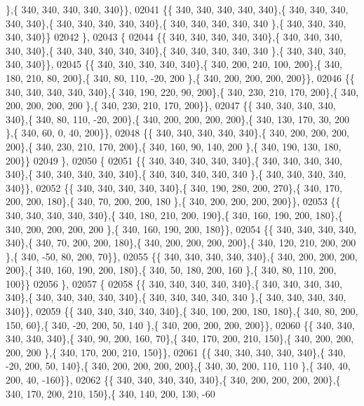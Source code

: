 \begin{DoxyCode}
      \},\{ 340, 340, 340, 340, 340\}\},
02041 \{\{ 340, 340, 340, 340, 340\},\{ 340, 340, 340, 340, 340\},\{ 340, 340, 340, 340, 340\},\{ 340, 340, 340, 340, 340
      \},\{ 340, 340, 340, 340, 340\}\}
02042 \},
02043 \{
02044 \{\{ 340, 340, 340, 340, 340\},\{ 340, 340, 340, 340, 340\},\{ 340, 340, 340, 340, 340\},\{ 340, 340, 340, 340, 340
      \},\{ 340, 340, 340, 340, 340\}\},
02045 \{\{ 340, 340, 340, 340, 340\},\{ 340, 200, 240, 100, 200\},\{ 340, 180, 210,  80, 200\},\{ 340,  80, 110, -20, 200
      \},\{ 340, 200, 200, 200, 200\}\},
02046 \{\{ 340, 340, 340, 340, 340\},\{ 340, 190, 220,  90, 200\},\{ 340, 230, 210, 170, 200\},\{ 340, 200, 200, 200, 200
      \},\{ 340, 230, 210, 170, 200\}\},
02047 \{\{ 340, 340, 340, 340, 340\},\{ 340,  80, 110, -20, 200\},\{ 340, 200, 200, 200, 200\},\{ 340, 130, 170,  30, 200
      \},\{ 340,  60,   0,  40, 200\}\},
02048 \{\{ 340, 340, 340, 340, 340\},\{ 340, 200, 200, 200, 200\},\{ 340, 230, 210, 170, 200\},\{ 340, 160,  90, 140, 200
      \},\{ 340, 190, 130, 180, 200\}\}
02049 \},
02050 \{
02051 \{\{ 340, 340, 340, 340, 340\},\{ 340, 340, 340, 340, 340\},\{ 340, 340, 340, 340, 340\},\{ 340, 340, 340, 340, 340
      \},\{ 340, 340, 340, 340, 340\}\},
02052 \{\{ 340, 340, 340, 340, 340\},\{ 340, 190, 280, 200, 270\},\{ 340, 170, 200, 200, 180\},\{ 340,  70, 200, 200, 180
      \},\{ 340, 200, 200, 200, 200\}\},
02053 \{\{ 340, 340, 340, 340, 340\},\{ 340, 180, 210, 200, 190\},\{ 340, 160, 190, 200, 180\},\{ 340, 200, 200, 200, 200
      \},\{ 340, 160, 190, 200, 180\}\},
02054 \{\{ 340, 340, 340, 340, 340\},\{ 340,  70, 200, 200, 180\},\{ 340, 200, 200, 200, 200\},\{ 340, 120, 210, 200, 200
      \},\{ 340, -50,  80, 200,  70\}\},
02055 \{\{ 340, 340, 340, 340, 340\},\{ 340, 200, 200, 200, 200\},\{ 340, 160, 190, 200, 180\},\{ 340,  50, 180, 200, 160
      \},\{ 340,  80, 110, 200, 100\}\}
02056 \},
02057 \{
02058 \{\{ 340, 340, 340, 340, 340\},\{ 340, 340, 340, 340, 340\},\{ 340, 340, 340, 340, 340\},\{ 340, 340, 340, 340, 340
      \},\{ 340, 340, 340, 340, 340\}\},
02059 \{\{ 340, 340, 340, 340, 340\},\{ 340, 100, 200, 180, 180\},\{ 340,  80, 200, 150,  60\},\{ 340, -20, 200,  50, 140
      \},\{ 340, 200, 200, 200, 200\}\},
02060 \{\{ 340, 340, 340, 340, 340\},\{ 340,  90, 200, 160,  70\},\{ 340, 170, 200, 210, 150\},\{ 340, 200, 200, 200, 200
      \},\{ 340, 170, 200, 210, 150\}\},
02061 \{\{ 340, 340, 340, 340, 340\},\{ 340, -20, 200,  50, 140\},\{ 340, 200, 200, 200, 200\},\{ 340,  30, 200, 110, 110
      \},\{ 340,  40, 200,  40, -160\}\},
02062 \{\{ 340, 340, 340, 340, 340\},\{ 340, 200, 200, 200, 200\},\{ 340, 170, 200, 210, 150\},\{ 340, 140, 200, 130, -60

\end{DoxyCode}
